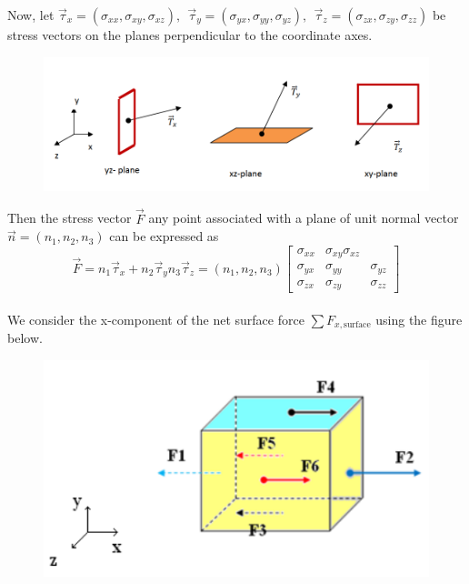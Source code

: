 \documentclass[11pt]{report}
\newcommand{\sps}{\\[0.2cm]}
\newcommand{\dsp}{\displaystyle}
\newcommand{\NI}{\noindent}
\begin{document}
	\NI Now, let $\vec{\tau}_x = (\sigma_{xx}, \sigma_{xy}, \sigma_{xz}),~~ \vec{\tau}_y = (\sigma_{yx}, \sigma_{yy}, \sigma_{yz}),~~ \vec{\tau}_z = (\sigma_{zx}, \sigma_{zy}, \sigma_{zz})$ be stress vectors on the planes perpendicular to the coordinate axes.
	\begin{figure}[!h]
		\centering
		\includegraphics[width=1.02\linewidth]{niyi_img1}
	\end{figure}
	Then the stress vector $\vec{F}$ any point associated with a plane of unit normal vector $\vec{n}=(n_1, n_2, n_3)$ can be expressed as
	\begin{equation}
		\vec{F} = n_1\vec{\tau}_x + n_2\vec{\tau}_y n_3\vec{\tau}_z = (n_1, n_2, n_3) \begin{bmatrix}
			\sigma_{xx} & \sigma_{xy} \sigma_{xz}\sps
			\sigma_{yx} & \sigma_{yy} & \sigma_{yz}\sps
			\sigma_{zx} & \sigma_{zy} & \sigma_{zz}
		\end{bmatrix} \tag{4}\label{eq:2_t1_4}
	\end{equation}
	{~}\sps
	We consider the x-component of the net surface force $\dsp \sum F_{x,\text{surface}}$ using the figure below.
		\begin{figure}[!h]
		\centering
		\includegraphics[width=0.9\linewidth]{niyi_img2}
	\end{figure}
	
\end{document}
